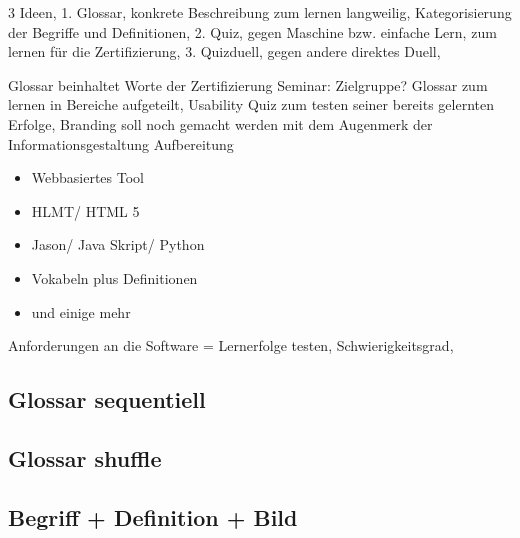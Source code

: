 \documentclass[a4paper, 12pt, twoside, BCOR=20mm, DIV=calc, abstracton, parskip=half*, toc=bibliography, toc=listof, headsepline, footsepline, headings=small, numbers=enddot]{scrreprt}
\begin{document}
	3 Ideen, 
	1. Glossar, konkrete Beschreibung zum lernen langweilig, Kategorisierung der Begriffe und Definitionen, 
	2. Quiz, gegen Maschine bzw. einfache Lern, zum lernen für die Zertifizierung,
	3. Quizduell, gegen andere direktes Duell, 
	
	Glossar beinhaltet Worte der Zertifizierung Seminar: Zielgruppe? 
	Glossar zum lernen in Bereiche aufgeteilt, Usability Quiz zum testen seiner bereits gelernten Erfolge, 
	Branding soll noch gemacht werden mit dem Augenmerk der Informationsgestaltung Aufbereitung
	\begin{itemize}
		\item{Webbasiertes Tool}
		\item{HLMT/ HTML 5}
		\item{Jason/ Java Skript/ Python}
		\item{Vokabeln plus Definitionen}
		\item und einige mehr  
	\end{itemize}
	
	Anforderungen an die Software = Lernerfolge testen, Schwierigkeitsgrad, 
	
	\subsection{Glossar sequentiell}
	\subsection{Glossar shuffle}
	\subsection{Begriff + Definition + Bild}
\end{document}
